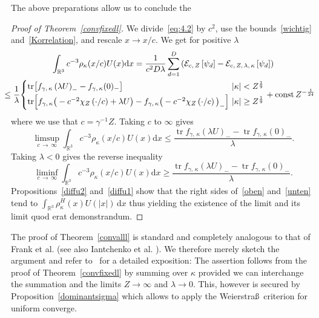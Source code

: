 \documentclass[10pt]{amsart}
\theoremstyle{definition}
\DeclareMathOperator{\tr}{tr}
\DeclareMathOperator{\const}{const}
\newcommand*\rd{\mathrm{d}}
\newcommand*\dx{\mathrm{d}x}
\newcommand*\rz{\mathbb{R}}
\newcommand*\cE{\mathcal{E}}
\begin{document}
The above preparations allow us to conclude the
\begin{proof}[Proof of Theorem~\ref{convfixedl}]
We divide~\eqref{eq:4.2} by $c^2$, use the bounds~\eqref{wichtig} and~\eqref{Korrelation}, and rescale $x\to x/c$. We get for positive $\lambda$
\begin{multline}\label{eq:reduced}
\int_{\rz^3}c^{-3}\rho_\kappa(x/c)U(x)\rd x =\frac1{c^2D\lambda}\sum_{d=1}^D\left(\cE_{c,\,Z}\left[\psi_d\right]-\cE_{c,\,Z,\,\lambda,\,\kappa}\left[\psi_d\right]\right) 
\\
\mkern-15mu\leq\frac1\lambda
\!
\begin{cases}
\tr\!\left[f_{\gamma,\,\kappa}\left(\lambda U\right)_{-}-f_{\gamma,\,\kappa}(0)_{-}\right] &\!\!\!\!|\kappa|<Z^\frac19\\[0.25em]
\tr\!\left[f_{\gamma,\,\kappa}\big(-c^{-2}\chi_Z\left(\cdot/c\right)+\lambda U\big)-f_{\gamma,\,\kappa}\big(-c^{-2}\chi_Z\left(\cdot/c\right)\big)_{-}\right]& \!\!\!\!|\kappa|\geq Z^\frac19
\end{cases} + \const Z^{-\frac1{24}}
\end{multline}
where we use that $c=\gamma^{-1}Z$. Taking $c$ to $\infty$ gives
\begin{equation}\label{oben}
\limsup_{c\,\to\,\infty}\int_{\rz^3}c^{-3}\rho_\kappa(x/c)U(x)\rd x
\leq \frac{\tr f_{\gamma,\,\kappa}(\lambda U)_--\tr f_{\gamma,\,\kappa}(0)_-}{\lambda}.
\end{equation}
Taking $\lambda<0$ gives the reverse inequality
\begin{equation}\label{unten}
\liminf_{c\,\to\,\infty}\int_{\rz^3}c^{-3}\rho_\kappa(x/c)U(x)\rd x
\geq \frac{\tr f_{\gamma,\,\kappa}(\lambda U)_--\tr f_{\gamma,\,\kappa}(0)_-}{\lambda}.
\end{equation}
Propositions~\ref{diffu2} and~\ref{diffu1} show that the right sides of~\eqref{oben} and~\eqref{unten} tend to $\int_{\rz^3} \rho_{\kappa}^H(x)U(|x|)\,\dx$ thus yielding the existence of the limit and its limit quod erat demonstrandum.
\end{proof}


The proof of Theorem~\ref{convalll} is standard and completely analogous to that of Frank et al. \cite[Theorem~1.2]{Franketal2020P} (see also Iantchenko et al. \cite[Theorem~2]{Iantchenkoetal1996}). We therefore merely sketch the argument and refer to~\cite[Section~1.3]{Franketal2020P} for a detailed exposition: The assertion follows from the proof of Theorem~\ref{convfixedl} by summing over $\kappa$ provided we can interchange the summation and the limits $Z\to\infty$ and $\lambda\to0$. This, however is secured by Proposition~\ref{dominantsigma} which allows to apply the Weierstra\ss~criterion for uniform converge.
\end{document}
